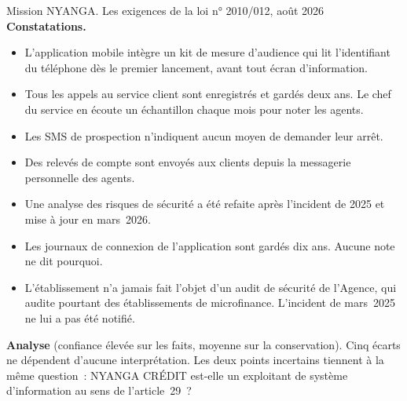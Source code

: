 \begin{boxscenario}{Mission NYANGA. Les exigences de la loi n° 2010/012, août 2026}
\textbf{Constatations.}
\begin{itemize}
    \item L'application mobile intègre un kit de mesure d'audience qui lit
          l'identifiant du téléphone dès le premier lancement, avant tout
          écran d'information.
    \item Tous les appels au service client sont enregistrés et gardés deux
          ans. Le chef du service en écoute un échantillon chaque mois pour
          noter les agents.
    \item Les SMS de prospection n'indiquent aucun moyen de demander leur
          arrêt.
    \item Des relevés de compte sont envoyés aux clients depuis la
          messagerie personnelle des agents.
    \item Une analyse des risques de sécurité a été refaite après l'incident
          de 2025 et mise à jour en mars~2026.
    \item Les journaux de connexion de l'application sont gardés dix ans.
          Aucune note ne dit pourquoi.
    \item L'établissement n'a jamais fait l'objet d'un audit de sécurité de
          l'Agence, qui audite pourtant des établissements de microfinance.
          L'incident de mars~2025 ne lui a pas été notifié.
\end{itemize}

\textbf{Analyse} (confiance élevée sur les faits, moyenne sur
la conservation). Cinq écarts ne dépendent d'aucune interprétation. Les
deux points incertains tiennent à la même question~: NYANGA CRÉDIT est-elle
un exploitant de système d'information au sens de l'article~29~?
\end{boxscenario}

